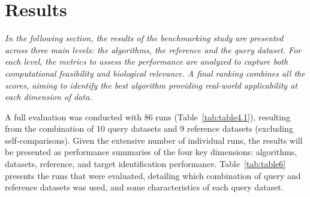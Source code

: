 ﻿%

%


\chapter{Results}
\label{cha:results}

\textit{In the following section, the results of the benchmarking study are presented across three main levels: the algorithms, the reference and the query dataset. For each level, the metrics to assess the performance are analyzed to capture both computational feasibility and biological relevance. A final ranking combines all the scores, aiming to identify the best algorithm providing real-world applicability at each dimension of data.}

A full evaluation was conducted with 86 runs (Table~\ref{tab:table4.1}), resulting from the combination of 10 query datasets and 9 reference datasets (excluding self-comparisons). Given the extensive number of individual runs, the results will be presented as performance summaries of the four key dimensions: algorithms, datasets, reference, and target identification performance. Table~\ref{tab:table6} presents the runs that were evaluated, detailing which combination of query and reference datasets was used, and some characteristics of each query dataset.

